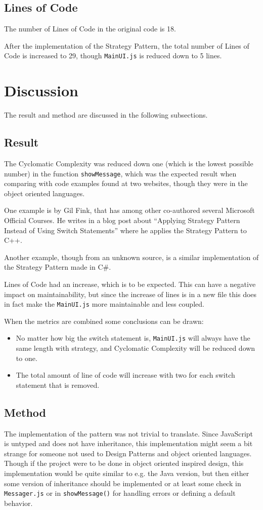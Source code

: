 \documentclass[conference, a4paper]{IEEEtran}
\begin{document}
\subsection{Lines of Code}
The number of Lines of Code in the original code is 18.

After the implementation of the Strategy Pattern, the total number of Lines of Code is increased to 29, though \texttt{MainUI.js} is reduced down to 5 lines.

\section{Discussion}
The result and method are discussed in the following subsections.

\subsection{Result}
The Cyclomatic Complexity was reduced down one (which is the lowest possible number) in the function \texttt{showMessage}, which was the expected result when comparing with code examples found at two websites, though they were in the object oriented languages.

One example is by Gil Fink, that has among other co-authored several Microsoft Official Courses. He writes in a blog post about ``Applying Strategy Pattern Instead of Using Switch Statements'' where he applies the Strategy Pattern to C++.~\cite{bibitem:GilFink}

Another example, though from an unknown source, is a similar implementation of the Strategy Pattern made in C\#.~\cite{bibitem:CSharp}

Lines of Code had an increase, which is to be expected. This can have a negative impact on maintainability, but since the increase of lines is in a new file this does in fact make the \texttt{MainUI.js} more maintainable and less coupled.

When the metrics are combined some conclusions can be drawn:
\begin{itemize}
	\item No matter how big the switch statement is, \texttt{MainUI.js} will always have the same length with strategy, and Cyclomatic Complexity will be reduced down to one.
	\item The total amount of line of code will increase with two for each switch statement that is removed.
\end{itemize}

\subsection{Method}
The implementation of the pattern was not trivial to translate. Since JavaScript is untyped and does not have inheritance, this implementation might seem a bit strange for someone not used to Design Patterns and object oriented languages. Though if the project were to be done in object oriented inspired design, this implementation would be quite similar to e.g. the Java version, but then either some version of inheritance should be implemented or at least some check in \texttt{Messager.js} or in \texttt{showMessage()} for handling errors or defining a default behavior.
\end{document}
